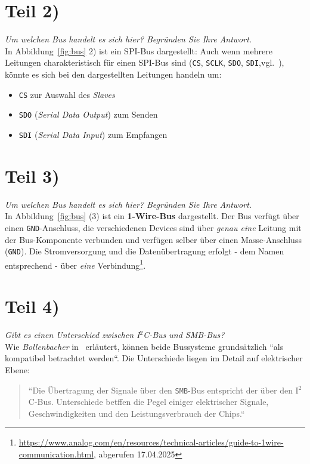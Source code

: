 \section{Teil 2)}

\textit{Um welchen Bus handelt es sich hier? Begründen Sie Ihre Antwort.}\\

\noindent
In Abbildung~\ref{fig:bus} 2) ist ein SPI-Bus dargestellt: Auch wenn mehrere Leitungen charakteristisch für einen SPI-Bus sind (\texttt{CS}, \texttt{SCLK}, \texttt{SDO}, \texttt{SDI},vgl.~\cite[179]{ES4}), könnte es sich bei den dargestellten Leitungen handeln um:
\begin{itemize}
    \itemsep0.5em
    \item \texttt{CS} zur Auswahl des \textit{Slaves}
    \item \texttt{SDO} (\textit{Serial Data Output}) zum Senden
    \item \texttt{SDI} (\textit{Serial Data Input}) zum Empfangen
\end{itemize}


\section{Teil 3)}

\textit{Um welchen Bus handelt es sich hier? Begründen Sie Ihre Antwort.}\\

\noindent
In Abbildung~\ref{fig:bus} (3) ist ein \textbf{1-Wire-Bus} dargestellt.
Der Bus verfügt über einen \texttt{GND}-Anschluss, die verschiedenen Devices sind über \textit{genau eine} Leitung mit der Bus-Komponente verbunden und verfügen selber über einen Masse-Anschluss (\texttt{GND}).
Die Stromversorgung und die Datenübertragung erfolgt - dem Namen entsprechend - über \textit{eine} Verbindung\footnote{
\url{https://www.analog.com/en/resources/technical-articles/guide-to-1wire-communication.html}, abgerufen 17.04.2025
}.

\section{Teil 4)}

\textit{Gibt es einen Unterschied zwischen I$^2$C-Bus und SMB-Bus?}\\

\noindent
Wie \textit{Bollenbacher} in~\cite[92]{ES5} erläutert, können beide Bussysteme grundsätzlich ``als kompatibel betrachtet werden``.
Die Unterschiede liegen im Detail auf elektrischer Ebene:

\blockquote[]{
    ``Die Übertragung der Signale über den \texttt{SMB}-Bus entspricht der über den
    I$^2$C-Bus. Unterschiede betffen die Pegel einiger elektrischer Signale, Geschwindigkeiten und den Leistungsverbrauch der Chips.``
}